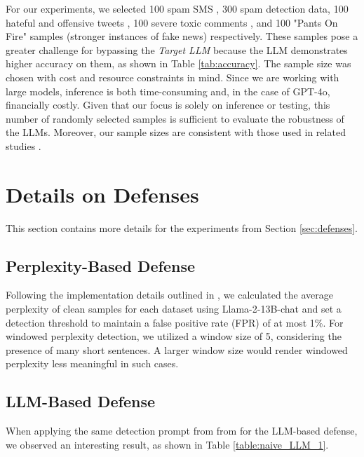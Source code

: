 \documentclass[11pt]{article}
\newcommand \targetLLM[0]{\textsl{Target LLM}}
\begin{document}
For our experiments,  we selected 100 spam SMS \cite{10.1145/2034691.2034742}, 300 \cite{deysi_spam_2023} spam detection data, 100 hateful and offensive tweets \cite{hateoffensive}, 100 severe toxic comments \cite{jigsaw-toxic-comment-classification-challenge}, and 100 "Pants On Fire" samples (stronger instances of fake news) \cite{wang-2017-liar} respectively. These samples pose a greater challenge for bypassing the \targetLLM{} because the LLM demonstrates higher accuracy on them, as shown in Table \ref{tab:accuracy}. The sample size was chosen with cost and resource constraints in mind. Since we are working with large models, inference is both time-consuming and, in the case of GPT-4o, financially costly. Given that our focus is solely on inference or testing, this number of randomly selected samples is sufficient to evaluate the robustness of the LLMs. Moreover, our sample sizes are consistent with those used in related studies \cite{299563, raina-etal-2024-llm, levy-etal-2023-guiding}.



\section{Details on Defenses}
\label{sec:defense_details}
This section contains more details for the experiments from Section \ref{sec:defenses}.

\subsection{Perplexity-Based Defense}

Following the implementation details outlined in \cite{299563}, we calculated the average perplexity of clean samples for each dataset using Llama-2-13B-chat \cite{touvron2023llama2openfoundation} and set a detection threshold to maintain a false positive rate (FPR) of at most 1\%. For windowed perplexity detection, we utilized a window size of 5, considering the presence of many short sentences. A larger window size would render windowed perplexity less meaningful in such cases.

\subsection{LLM-Based Defense}
\label{subsec:LLM_based_defense_details}
When applying the same detection prompt from from \cite{299563} for the LLM-based defense, we observed an interesting result, as shown in Table \ref{table:naive_LLM_1}. 
\end{document}
